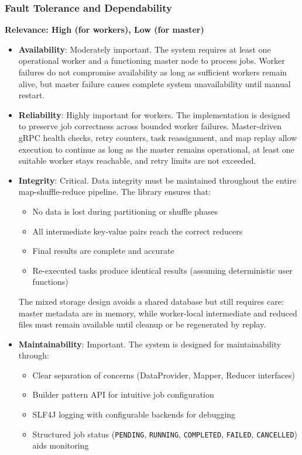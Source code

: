 \documentclass{scrartcl}
\begin{document}
\subsubsection{Fault Tolerance and Dependability}

\textbf{Relevance: High (for workers), Low (for master)}

\begin{itemize}
    \item \textbf{Availability}: Moderately important. The system requires at least one operational worker and a functioning master node to process jobs. Worker failures do not compromise availability as long as sufficient workers remain alive, but master failure causes complete system unavailability until manual restart.

    \item \textbf{Reliability}: Highly important for workers. The implementation is designed to preserve job correctness across bounded worker failures. Master-driven gRPC health checks, retry counters, task reassignment, and map replay allow execution to continue as long as the master remains operational, at least one suitable worker stays reachable, and retry limits are not exceeded.

    \item \textbf{Integrity}: Critical. Data integrity must be maintained throughout the entire map-shuffle-reduce pipeline. The library ensures that:
          \begin{itemize}
              \item No data is lost during partitioning or shuffle phases
              \item All intermediate key-value pairs reach the correct reducers
              \item Final results are complete and accurate
              \item Re-executed tasks produce identical results (assuming deterministic user functions)
          \end{itemize}
          The mixed storage design avoids a shared database but still requires care: master metadata are in memory, while worker-local intermediate and reduced files must remain available until cleanup or be regenerated by replay.

    \item \textbf{Maintainability}: Important. The system is designed for maintainability through:
          \begin{itemize}
              \item Clear separation of concerns (DataProvider, Mapper, Reducer interfaces)
              \item Builder pattern API for intuitive job configuration
              \item SLF4J logging with configurable backends for debugging
              \item Structured job status (\texttt{PENDING}, \texttt{RUNNING}, \texttt{COMPLETED}, \texttt{FAILED}, \texttt{CANCELLED}) aids monitoring
          \end{itemize}


\end{itemize}
\end{document}
